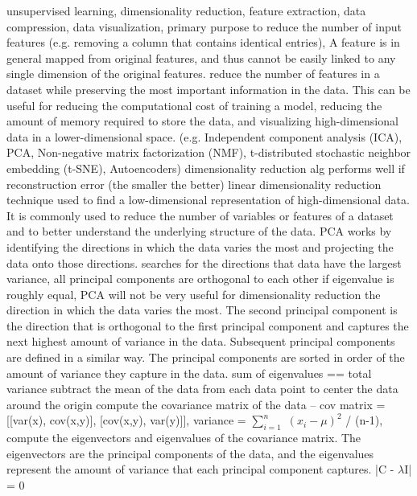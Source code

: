 \documentclass[10pt]{article}
\begin{document}
\smallbreak
{} unsupervised learning, dimensionality reduction, feature extraction, data compression, data visualization, primary purpose to reduce the number of input features (e.g. removing a column that contains identical entries), A feature is in general mapped from original features, and thus cannot be easily linked to any single dimension of the original features.
 reduce the number of features in a dataset while preserving the most important information in the data. This can be useful for reducing the computational cost of training a model, reducing the amount of memory required to store the data, and visualizing high-dimensional data in a lower-dimensional space. (e.g. Independent component analysis (ICA), PCA, Non-negative matrix factorization (NMF), t-distributed stochastic neighbor embedding (t-SNE), Autoencoders)
\NEW    dimensionality reduction alg performs well if reconstruction error (the smaller the better)
\NEW    linear dimensionality reduction technique used to find a low-dimensional representation of high-dimensional data. It is commonly used to reduce the number of variables or features of a dataset and to better understand the underlying structure of the data. PCA works by identifying the directions in which the data varies the most and projecting the data onto those directions.
\NEW    searches for the directions that data have the largest variance, all principal components are orthogonal to each other
\NEW    if eigenvalue is roughly equal, PCA will not be very useful for dimensionality reduction
 the direction in which the data varies the most. The second principal component is the direction that is orthogonal to the first principal component and captures the next highest amount of variance in the data. Subsequent principal components are defined in a similar way. The principal components are sorted in order of the amount of variance they capture in the data.
\NEW sum of eigenvalues == total variance
 subtract the mean of the data from each data point to center the data around the origin
 compute the covariance matrix of the data -- cov matrix =  [[var(x), cov(x,y)], [cov(x,y), var(y)]], variance = $\sum_{i=1}^n$ $(x_i - \mu)^2$ / (n-1),
 compute the eigenvectors and eigenvalues of the covariance matrix. The eigenvectors are the principal components of the data, and the eigenvalues represent the amount of variance that each principal component captures. |C - $\lambda$I| = 0
\end{document}
